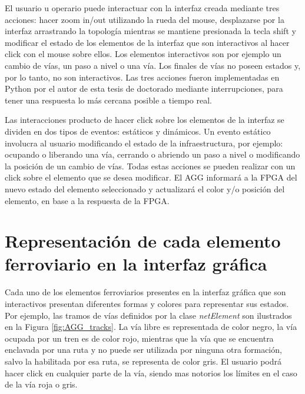 	El usuario u operario puede interactuar con la interfaz creada mediante tres acciones: hacer zoom in/out utilizando la rueda del mouse, desplazarse por la interfaz arrastrando la topología mientras se mantiene presionada la tecla shift y modificar el estado de los elementos de la interfaz que son interactivos al hacer click con el mouse sobre ellos. Los elementos interactivos son por ejemplo un cambio de vías, un paso a nivel o una vía. Los finales de vías no poseen estados y, por lo tanto, no son interactivos. Las tres acciones fueron implementadas en Python por el autor de esta tesis de doctorado mediante interrupciones, para tener una respuesta lo más cercana posible a tiempo real. 
	
	Las interacciones producto de hacer click sobre los elementos de la interfaz se dividen en dos tipos de eventos: estáticos y dinámicos. Un evento estático involucra al usuario modificando el estado de la infraestructura, por ejemplo: ocupando o liberando una vía, cerrando o abriendo un paso a nivel o modificando la posición de un cambio de vías. Todas estas acciones se pueden realizar con un click sobre el elemento que se desea modificar. El AGG informará a la FPGA del nuevo estado del elemento seleccionado y actualizará el color y/o posición del elemento, en base a la respuesta de la FPGA. 
	
	\section{Representación de cada elemento ferroviario en la interfaz gráfica}
	\label{sec:AGG_STATUS}
	
	Cada uno de los elementos ferroviarios presentes en la interfaz gráfica que son interactivos presentan diferentes formas y colores para representar sus estados. Por ejemplo, las tramos de vías definidos por la clase \textit{netElement} son ilustrados en la Figura \ref{fig:AGG_tracks}. La vía libre es representada de color negro, la vía ocupada por un tren es de color rojo, mientras que la vía que se encuentra enclavada por una ruta y no puede ser utilizada por ninguna otra formación, salvo la habilitada por esa ruta, se representa de color gris. El usuario podrá hacer click en cualquier parte de la vía, siendo mas notorios los límites en el caso de la vía roja o gris.
		
